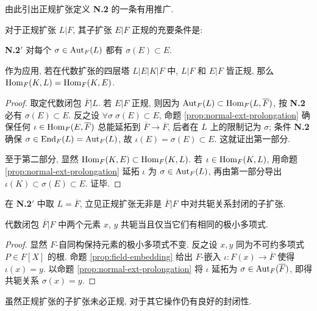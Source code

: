 由此引出正规扩张定义 \textbf{N.2} 的一条有用推广.
\begin{corollary}\label{prop:normal-subext}
	对于正规扩张 $L|F$, 其子扩张 $E|F$ 正规的充要条件是:
	\begin{compactdesc}
		\item[\bfseries {N}.2$'$] 对每个 $\sigma \in \operatorname{Aut}_F(L)$ 都有 $\sigma(E) \subset E$.
	\end{compactdesc}
	作为应用, 若在代数扩张的四层塔 $L|E|K|F$ 中, $L|F$ 和 $E|F$ 皆正规, 那么 $\operatorname{Hom}_F(K, L) = \operatorname{Hom}_F(K, E)$.
\end{corollary}
\begin{proof}
	取定代数闭包 $\overline{F}|L$. 若 $E|F$ 正规, 则因为 $\operatorname{Aut}_F(L) \subset \operatorname{Hom}_F(L, \overline{F})$, 按 \textbf{N.2} 必有 $\sigma(E) \subset E$. 反之设 $\forall\sigma\; \sigma(E) \subset E$, 命题 \ref{prop:normal-ext-prolongation} 确保任何 $\iota \in \operatorname{Hom}_F(E, \overline{F})$ 总能延拓到 $\overline{F} \to \overline{F}$, 后者在 $L$ 上的限制记为 $\sigma$; 条件 \textbf{N.2} 确保 $\sigma \in \operatorname{End}_F(L) = \operatorname{Aut}_F(L)$, 故 $\iota(E) = \sigma(E) \subset E$. 这就证出第一部分.

	至于第二部分, 显然 $\operatorname{Hom}_F(K,E) \subset \operatorname{Hom}_F(K,L)$. 若 $\iota \in \operatorname{Hom}_F(K,L)$, 用命题 \ref{prop:normal-ext-prolongation} 延拓 $\iota$ 为 $\sigma \in \operatorname{Aut}_F(L)$, 再由第一部分导出 $\iota(K) \subset \sigma(E) \subset E$. 证毕.
\end{proof}
在 \textbf{N.2$'$} 中取 $L = \overline{F}$, 立见正规扩张无非是 $\overline{F}|F$ 中对共轭关系封闭的子扩张.

\begin{corollary}\label{prop:root-conjugate}
	代数闭包 $\overline{F}|F$ 中两个元素 $x$, $y$ 共轭当且仅当它们有相同的极小多项式.
\end{corollary}
\begin{proof}
	显然 $F$-自同构保持元素的极小多项式不变. 反之设 $x,y$ 同为不可约多项式 $P \in F[X]$ 的根. 命题 \ref{prop:field-embedding} 给出 $F$-嵌入 $\iota: F(x) \to \overline{F}$ 使得 $\iota(x)=y$. 以命题 \ref{prop:normal-ext-prolongation} 将 $\iota$ 延拓为 $\sigma \in \operatorname{Aut}_F(\overline{F})$, 即得共轭关系 $\sigma(x)=y$.
\end{proof}

虽然正规扩张的子扩张未必正规, 对于其它操作仍有良好的封闭性.


